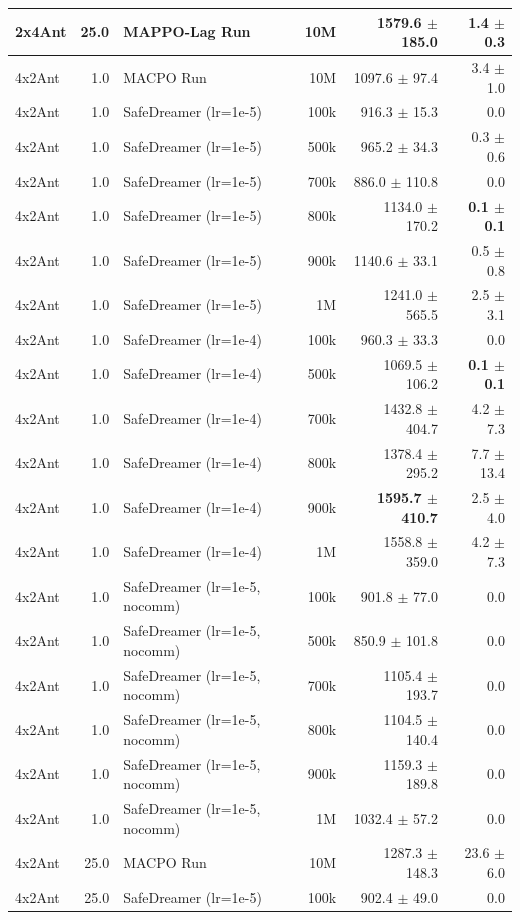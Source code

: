 \documentclass{article}
\begin{document}
\begin{longtable}{l r l r r r}
2x4Ant & 25.0 & MAPPO-Lag Run & 10M & 1579.6 $\pm$ 185.0 & 1.4 $\pm$ 0.3 \\
\midrule
4x2Ant & 1.0 & MACPO Run & 10M & 1097.6 $\pm$ 97.4 & 3.4 $\pm$ 1.0 \\
4x2Ant & 1.0 & SafeDreamer (lr=1e-5) & 100k & 916.3 $\pm$ 15.3 & 0.0 \\
4x2Ant & 1.0 & SafeDreamer (lr=1e-5) & 500k & 965.2 $\pm$ 34.3 & 0.3 $\pm$ 0.6 \\
4x2Ant & 1.0 & SafeDreamer (lr=1e-5) & 700k & 886.0 $\pm$ 110.8 & 0.0 \\
4x2Ant & 1.0 & SafeDreamer (lr=1e-5) & 800k & 1134.0 $\pm$ 170.2 & \textbf{0.1 $\pm$ 0.1} \\
4x2Ant & 1.0 & SafeDreamer (lr=1e-5) & 900k & 1140.6 $\pm$ 33.1 & 0.5 $\pm$ 0.8 \\
4x2Ant & 1.0 & SafeDreamer (lr=1e-5) & 1M & 1241.0 $\pm$ 565.5 & 2.5 $\pm$ 3.1 \\
4x2Ant & 1.0 & SafeDreamer (lr=1e-4) & 100k & 960.3 $\pm$ 33.3 & 0.0 \\
4x2Ant & 1.0 & SafeDreamer (lr=1e-4) & 500k & 1069.5 $\pm$ 106.2 & \textbf{0.1 $\pm$ 0.1} \\
4x2Ant & 1.0 & SafeDreamer (lr=1e-4) & 700k & 1432.8 $\pm$ 404.7 & 4.2 $\pm$ 7.3 \\
4x2Ant & 1.0 & SafeDreamer (lr=1e-4) & 800k & 1378.4 $\pm$ 295.2 & 7.7 $\pm$ 13.4 \\
4x2Ant & 1.0 & SafeDreamer (lr=1e-4) & 900k & \textbf{1595.7 $\pm$ 410.7} & 2.5 $\pm$ 4.0 \\
4x2Ant & 1.0 & SafeDreamer (lr=1e-4) & 1M & 1558.8 $\pm$ 359.0 & 4.2 $\pm$ 7.3 \\
4x2Ant & 1.0 & SafeDreamer (lr=1e-5, nocomm) & 100k & 901.8 $\pm$ 77.0 & 0.0 \\
4x2Ant & 1.0 & SafeDreamer (lr=1e-5, nocomm) & 500k & 850.9 $\pm$ 101.8 & 0.0 \\
4x2Ant & 1.0 & SafeDreamer (lr=1e-5, nocomm) & 700k & 1105.4 $\pm$ 193.7 & 0.0 \\
4x2Ant & 1.0 & SafeDreamer (lr=1e-5, nocomm) & 800k & 1104.5 $\pm$ 140.4 & 0.0 \\
4x2Ant & 1.0 & SafeDreamer (lr=1e-5, nocomm) & 900k & 1159.3 $\pm$ 189.8 & 0.0 \\
4x2Ant & 1.0 & SafeDreamer (lr=1e-5, nocomm) & 1M & 1032.4 $\pm$ 57.2 & 0.0 \\
\midrule
4x2Ant & 25.0 & MACPO Run & 10M & 1287.3 $\pm$ 148.3 & 23.6 $\pm$ 6.0 \\
4x2Ant & 25.0 & SafeDreamer (lr=1e-5) & 100k & 902.4 $\pm$ 49.0 & 0.0 \\

\end{longtable}
\end{document}
